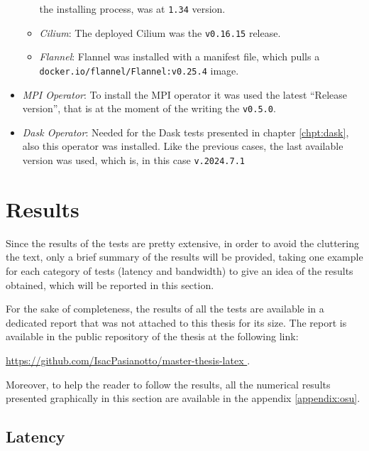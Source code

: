 \begin{itemize}
\begin{itemize}
        the installing process, was at \texttt{1.34} version.
      \item \textit{Cilium}: The deployed Cilium was the \texttt{v0.16.15}
        release.
      \item \textit{Flannel}: Flannel was installed with a manifest file, which
        pulls a \\ \texttt{docker.io/flannel/Flannel:v0.25.4} image.
    \end{itemize}
  \item \textit{MPI Operator}: To install the MPI operator it was used the
    latest ``Release version'', that is at the moment of the writing the
    \texttt{v0.5.0}.
  \item \textit{Dask Operator}: Needed for the Dask tests presented in chapter
    \ref{chpt:dask}, also this operator was installed. Like the previous cases,
    the last available version was used, which is, in this case
    \texttt{v.2024.7.1}
\end{itemize}


\section{Results}\label{sec:cniresuls}

Since the results of the tests are pretty extensive, in order to avoid the
cluttering the text, only a brief summary of the results will be provided,
taking one example for each category of tests (latency and bandwidth) to give an
idea of the results obtained, which will be reported in this section.

For the sake of completeness, the results of all the tests are available in a
dedicated report that was not attached to this thesis for its size.
The report is available in the public repository of the thesis at the following link:

\begin{center}
  \url{
    https://github.com/IsacPasianotto/master-thesis-latex
  }.
\end{center}

Moreover, to help the reader to follow the results, all the numerical results
presented graphically in this section are available in the appendix \ref{appendix:osu}.

\subsection{Latency}\label{subsec:results-latency}

